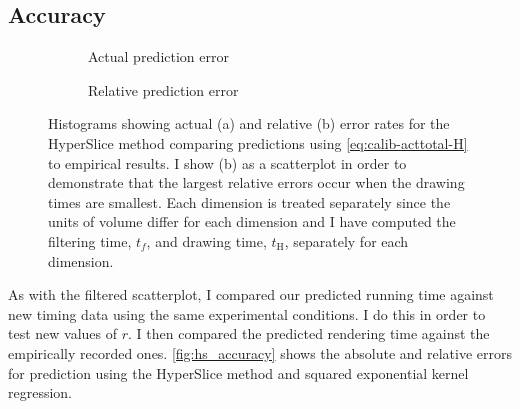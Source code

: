 \begin{table}[h]
\centering
\caption[Rendering time calibration results]{%
  Table showing the calibrated parameters, $a$, $t_f$, and $t_\text{H}$,
  as a result of running a segmented regression fit using the data I gathered
  from my timing experiments and \autoref{eq:expanded-regression}.
  The factors $t_f$ and $t_\text{H}$ are in nanoseconds and $a$ is defined
  in terms of fragments per sample.
}

\label{tbl:model_fits}
\end{table}

\subsection{Accuracy}
 
\begin{figure*}[t]
  \centering
  \begin{subfigure}{0.5\textwidth}
    
    \caption{Actual prediction error}
    \label{fig:hs_abs_error}
  \end{subfigure}%
  \begin{subfigure}{0.5\textwidth}
    
    \caption{Relative prediction error}
    \label{fig:hs_rel_error}
  \end{subfigure}
  \caption[Actual and relative error rates of prediction]{%
    Histograms showing actual (a) and relative (b) error rates
    for the HyperSlice method
    comparing predictions using \autoref{eq:calib-acttotal-H} to empirical 
    results.  I show (b) as a scatterplot in order to demonstrate that
    the largest relative errors occur when the drawing times are 
    smallest.
    Each dimension is treated separately since the units of volume differ
    for each dimension and I have computed the filtering time, $t_f$,
    and drawing time, $t_\text{H}$, separately for each dimension.
  }
  \label{fig:hs_accuracy}
\end{figure*}

As with the filtered scatterplot, I compared our predicted running time
against new timing data using the same experimental conditions.  I do this
in order to test new values of $r$.  I then compared the predicted 
rendering time against the empirically recorded ones. 
\autoref{fig:hs_accuracy} shows the absolute and relative
errors for prediction using the HyperSlice method and squared exponential 
kernel regression.

